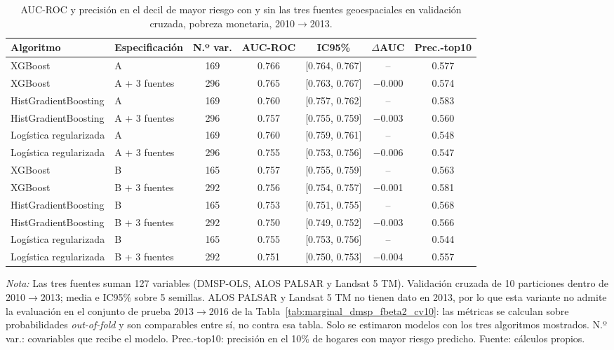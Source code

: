 \begin{table}[H]
  \centering
  \caption{AUC-ROC y precisión en el decil de mayor riesgo con y sin las
  tres fuentes geoespaciales en validación cruzada, pobreza monetaria,
  2010$\to$2013.}
  \label{tab:geo3_cv}
  \footnotesize
  \setlength{\tabcolsep}{3pt}
  \begin{tabular}{llccccc}
    \toprule
    \textbf{Algoritmo} & \textbf{Especificación} & \textbf{N.º var.} & \textbf{AUC-ROC} & \textbf{IC95\%} & \textbf{$\Delta$AUC} & \textbf{Prec.-top10} \\
    \midrule
    XGBoost                  & A              & 169 & 0.766 & [0.764, 0.767] & -- & 0.577 \\
    XGBoost                  & A + 3 fuentes  & 296 & 0.765 & [0.763, 0.767] & $-$0.000 & 0.574 \\
    \addlinespace
    HistGradientBoosting     & A              & 169 & 0.760 & [0.757, 0.762] & -- & 0.583 \\
    HistGradientBoosting     & A + 3 fuentes  & 296 & 0.757 & [0.755, 0.759] & $-$0.003 & 0.560 \\
    \addlinespace
    Logística regularizada   & A              & 169 & 0.760 & [0.759, 0.761] & -- & 0.548 \\
    Logística regularizada   & A + 3 fuentes  & 296 & 0.755 & [0.753, 0.756] & $-$0.006 & 0.547 \\
    \addlinespace
    XGBoost                  & B              & 165 & 0.757 & [0.755, 0.759] & -- & 0.563 \\
    XGBoost                  & B + 3 fuentes  & 292 & 0.756 & [0.754, 0.757] & $-$0.001 & 0.581 \\
    \addlinespace
    HistGradientBoosting     & B              & 165 & 0.753 & [0.751, 0.755] & -- & 0.568 \\
    HistGradientBoosting     & B + 3 fuentes  & 292 & 0.750 & [0.749, 0.752] & $-$0.003 & 0.566 \\
    \addlinespace
    Logística regularizada   & B              & 165 & 0.755 & [0.753, 0.756] & -- & 0.544 \\
    Logística regularizada   & B + 3 fuentes  & 292 & 0.751 & [0.750, 0.753] & $-$0.004 & 0.557 \\
    \bottomrule
  \end{tabular}
  \begin{minipage}{0.95\textwidth}
    \vspace{4pt}
    \footnotesize \textit{Nota:} Las tres fuentes suman 127 variables (DMSP-OLS,
    ALOS PALSAR y Landsat 5 TM). Validación cruzada de 10 particiones dentro
    de 2010$\to$2013; media e IC95\% sobre 5 semillas. ALOS PALSAR y Landsat 5 TM
    no tienen dato en 2013, por lo que esta variante no admite la evaluación en
    el conjunto de prueba 2013$\to$2016    de la Tabla~\ref{tab:marginal_dmsp_fbeta2_cv10}: las métricas se calculan sobre
    probabilidades \emph{out-of-fold} y son comparables entre sí, no contra
    esa tabla. Solo se estimaron modelos con los tres algoritmos mostrados.
    N.º var.: covariables que recibe el modelo. Prec.-top10: precisión en el
    10\% de hogares con mayor riesgo predicho. Fuente: cálculos propios.
  \end{minipage}
\end{table}
